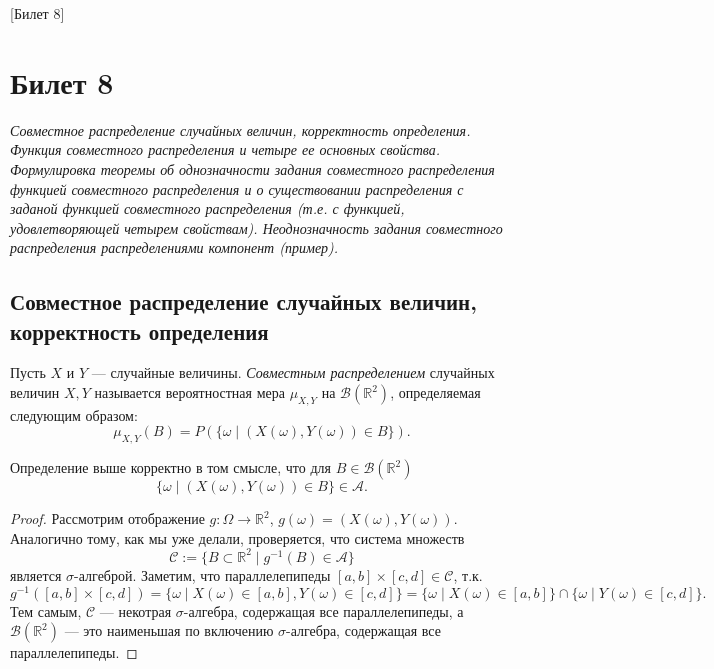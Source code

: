[Билет 8]

\section{Билет 8}

\begin{center}
    \it Совместное распределение случайных величин, корректность определения.
    Функция совместного распределения и четыре ее основных свойства.
    Формулировка теоремы об однозначности задания совместного распределения функцией совместного распределения и о существовании распределения с заданой функцией совместного распределения (т.е. с функцией, удовлетворяющей четырем свойствам).
    Неоднозначность задания совместного распределения распределениями компонент (пример).
\end{center}

\sectionbreak
\subsection{Совместное распределение случайных величин, корректность определения}

\begin{definition}
    Пусть $X$ и $Y$ --- случайные величины.
    {\it Совместным распределением} случайных величин $X, Y$ называется вероятностная мера $\mu_{X, Y}$ на $\mathcal{B}(\mathbb{R}^2)$,
    определяемая следующим образом:
    \[
        \mu_{X, Y}(B) = P(\{\omega \mid (X(\omega), Y(\omega)) \in B\}).
    \]
\end{definition}

\begin{proposal*}
    Определение выше корректно в том смысле, что для $B \in \mathcal{B}(\mathbb{R}^2)$
    \[
        \{\omega \mid (X(\omega), Y(\omega))\in B\} \in \mathcal{A}.
    \]
\end{proposal*}

\begin{proof}
    Рассмотрим отображение $g \colon \Omega \to \mathbb{R}^2$, $g(\omega) = (X(\omega), Y(\omega))$.
    Аналогично тому, как мы уже делали, проверяется, что система множеств
    \[
        \mathcal{C} := \{B \subset \mathbb{R}^2 \mid g^{-1}(B) \in \mathcal{A}\}
    \]
    является $\sigma$-алгеброй.
    Заметим, что параллелепипеды $[a, b] \times [c, d] \in \mathcal{C}$, т.к.
    \[
        g^{-1}([a, b] \times [c, d]) = \{\omega \mid X(\omega) \in [a, b], Y(\omega) \in [c, d]\} = \{\omega \mid X(\omega) \in [a, b]\} \cap \{\omega \mid Y(\omega) \in[c, d]\}.
    \]
    Тем самым, $\mathcal{C}$ --- некотрая $\sigma$-алгебра, содержащая все параллелепипеды, а $\mathcal{B}(\mathbb{R}^2)$ --- это наименьшая по включению $\sigma$-алгебра, содержащая все параллелепипеды.
\end{proof}

